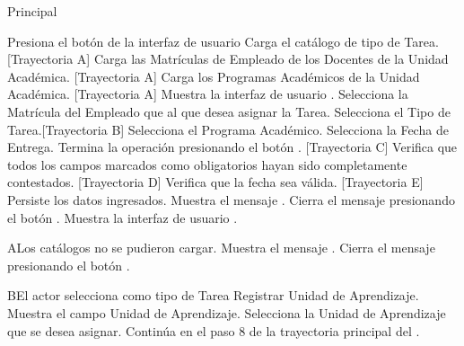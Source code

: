 \begin{UCtrayectoria}{Principal}

    \UCpaso[\UCactor] Presiona el botón  de la interfaz de usuario 
    \UCpaso Carga el catálogo de tipo de Tarea. [Trayectoria A]
    \UCpaso Carga las Matrículas de Empleado de los Docentes de la Unidad Académica. [Trayectoria A]
    \UCpaso Carga los Programas Académicos de la Unidad Académica. [Trayectoria A]
    \UCpaso Muestra la interfaz de usuario .
    \UCpaso[\UCactor] Selecciona la Matrícula del Empleado que al que desea asignar la Tarea.
    \UCpaso[\UCactor] Selecciona el Tipo de Tarea.[Trayectoria B]
    \UCpaso[\UCactor] Selecciona el Programa Académico.
    \UCpaso[\UCactor] Selecciona la Fecha de Entrega.
    \UCpaso[\UCactor] Termina la operación presionando el botón . [Trayectoria C]
    \UCpaso Verifica que todos los campos marcados como obligatorios hayan sido completamente contestados. [Trayectoria D]
    \UCpaso Verifica que la fecha sea válida. [Trayectoria E]
    \UCpaso Persiste los datos ingresados.
    \UCpaso Muestra el mensaje .
    \UCpaso[\UCactor] Cierra el mensaje presionando el botón .
    \UCpaso Muestra la interfaz de usuario .
\end{UCtrayectoria}


\begin{UCtrayectoriaA}{A}{Los catálogos no se pudieron cargar.}
    \UCpaso Muestra el mensaje .
    \UCpaso[\UCactor] Cierra el mensaje presionando el botón .
\end{UCtrayectoriaA}


\begin{UCtrayectoriaA}{B}{El actor selecciona como tipo de Tarea Registrar Unidad de Aprendizaje.}
    \UCpaso Muestra el campo Unidad de Aprendizaje.
    \UCpaso[\UCactor] Selecciona la Unidad de Aprendizaje que se desea asignar.
    \UCpaso Continúa en el paso 8 de la trayectoria principal del .
\end{UCtrayectoriaA}

